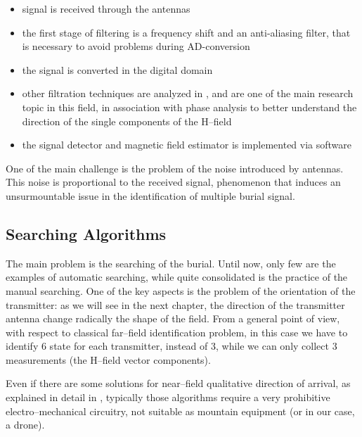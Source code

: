 \begin{itemize}
\item signal is received through the antennas
\item the first stage of filtering is a frequency shift and  an anti-aliasing filter, that is necessary to avoid problems during AD-conversion
\item the signal is converted in the digital domain
\item other filtration techniques are analyzed  in \citep{Salos2007}, and are one of the main research topic in this field, in association with phase analysis to better understand the direction of the single components of the H--field
\item the signal detector and magnetic field estimator is implemented via software
\end{itemize}

One of the main challenge is the problem of the noise introduced by antennas. This noise is proportional to the received signal, phenomenon that induces an unsurmountable issue in the identification of multiple burial signal.

\subsection{Searching Algorithms}

The main problem is the searching of the burial. Until now, only few are the examples of automatic searching, while quite consolidated is the practice of the manual searching. One of the key aspects is the problem of the orientation of the transmitter: as we will see in the next chapter, the direction of the transmitter antenna change radically the shape of the field. From a general point of view, with respect to classical far--field identification problem, in this case we have to identify 6 state for each transmitter, instead of 3, while we can only collect 3 measurements (the H--field vector components).

Even if there are some solutions for near--field qualitative direction of arrival, as explained in detail in \citep{hutchinson2000arrl}, typically those algorithms require a very prohibitive electro--mechanical circuitry, not suitable as mountain equipment (or in our case, a drone).

